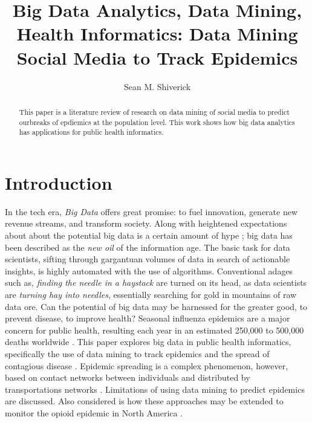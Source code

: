 \documentclass[sigconf]{acmart}
\begin{document}
\title{Big Data Analytics, Data Mining, Health Informatics: 
Data Mining Social Media to Track Epidemics}
\author{Sean M. Shiverick}


\begin{abstract}
This paper is a literature review of research on data mining of social media 
to predict ourbreaks of epdiemics at the population level. This work shows how 
big data analytics has applications for public health informatics.
\end{abstract}


\maketitle

\section{Introduction}

In the tech era, \textit{Big Data} offers great promise: to fuel innovation, 
generate new revenue streams, and transform society. Along with heightened 
expectations about about the potential big data is a certain amount of hype 
\cite{gupta15}; big data has been described as the \textit{new oil} of the 
information age.  The basic task for data scientists, sifting through gargantuan 
volumes of data in search of actionable insights, is highly automated with the 
use of algorithms. Conventional adages such as, \textit{finding the needle in 
a haystack} are turned on its head, as data scientists are \textit{turning hay 
into needles}, essentially searching for gold in mountains of raw data ore. Can 
the potential of big data may be harnessed for the greater good, to prevent 
disease, to improve health? Seasonal influenza epidemics are a major concern 
for public health, resulting each year in an estimated 250,000 to 500,000 deaths 
worldwide \cite{who16}. This paper explores big data in public health informatics, 
specifically the use of data mining to track epidemics and the spread of contagious 
disease \cite{hay13}. Epidemic spreading is a complex phenomenon, however, based 
on contact networks between individuals and distributed by transportations networks 
\cite{Colizza06}. Limitations of using data mining to predict epidemics are 
discussed. Also considered is how these approaches may be extended to monitor 
the opioid epidemic in North America \cite{volkow14}.
\end{document}
